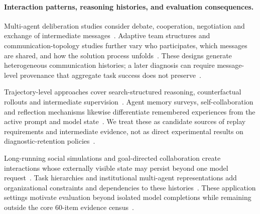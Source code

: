 \paragraph{Interaction patterns, reasoning histories, and evaluation consequences.}
Multi-agent deliberation studies consider debate, cooperation, negotiation and exchange of intermediate messages~\cite{ext069,ext070,ext074,ext082,ext083}.
Adaptive team structures and communication-topology studies further vary who participates, which messages are shared, and how the solution process unfolds~\cite{ext084,ext085,ext086,ext087}.
These designs generate heterogeneous communication histories; a later diagnosis can require message-level provenance that aggregate task success does not preserve~\cite{ext095,ext105,ext108,ext115}.

Trajectory-level approaches cover search-structured reasoning, counterfactual rollouts and intermediate supervision~\cite{ext055,ext056,ext061}.
Agent memory surveys, self-collaboration and reflection mechanisms likewise differentiate remembered experiences from the active prompt and model state~\cite{ext092,ext093,ext094}.
We treat these as candidate sources of replay requirements and intermediate evidence, not as direct experimental results on diagnostic-retention policies~\cite{ext102,ext111,ext062}.

Long-running social simulations and goal-directed collaboration create interactions whose externally visible state may persist beyond one model request~\cite{ext088,ext089}.
Task hierarchies and institutional multi-agent representations add organizational constraints and dependencies to these histories~\cite{ext090,ext091}.
These application settings motivate evaluation beyond isolated model completions while remaining outside the core 60-item evidence census~\cite{ext109,ext143}.

